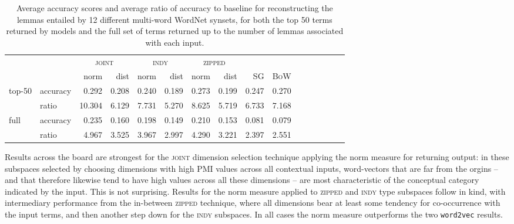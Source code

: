 \begin{table}
\centering
\begin{tabular}{llrrrrrrrrrrrr|rr}
\hline
&& \multicolumn{2}{c}{\textsc{joint}} & \multicolumn{2}{c}{\textsc{indy}} & \multicolumn{2}{c}{\textsc{zipped}} & \multicolumn{2}{c}{} \\
&& norm & dist & norm & dist & norm & \multicolumn{1}{r}{dist} & \textsc{SG} & \textsc{BoW} \\
\hline
\multirow{2}{*}{top-50} & accuracy & 0.292 & 0.208 & 0.240 & 0.189 & 0.273 & \multicolumn{1}{r|}{0.199} & 0.247 & 0.270 \\
& ratio & 10.304 & 6.129 & 7.731 & 5.270 & 8.625 & \multicolumn{1}{r|}{5.719} & 6.733 & 7.168 \\
\hline
\multirow{2}{*}{full} & accuracy & 0.235 & 0.160 & 0.198 & 0.149 & 0.210 & \multicolumn{1}{r|}{0.153} & 0.081 & 0.079 \\
& ratio & 4.967 & 3.525 & 3.967 & 2.997 & 4.290 & \multicolumn{1}{r|}{3.221} & 2.397 & 2.551 \\
\hline
\end{tabular}
\caption{Average accuracy scores and average ratio of accuracy to baseline for reconstructing the lemmas entailed by 12 different multi-word WordNet synsets, for both the top 50 terms returned by models and the full set of terms returned up to the number of lemmas associated with each input.}
\label{tab:wordnet}
\end{table}

Results across the board are strongest for the \textsc{joint} dimension selection technique applying the norm measure for returning output: in these subspaces selected by choosing dimensions with high PMI values across all contextual inputs, word-vectors that are far from the orgins -- and that therefore likewise tend to have high values across all these dimensions -- are most characteristic of the conceptual category indicated by the input.  This is not surprising.  Results for the norm measure applied to \textsc{zipped} and \textsc{indy} type subspaces follow in kind, with intermediary performance from the in-between \textsc{zipped} technique, where all dimensions bear at least some tendency for co-occurrence with the input terms, and then another step down for the \textsc{indy} subspaces.  In all cases the norm measure outperforms the two \texttt{word2vec} results.

